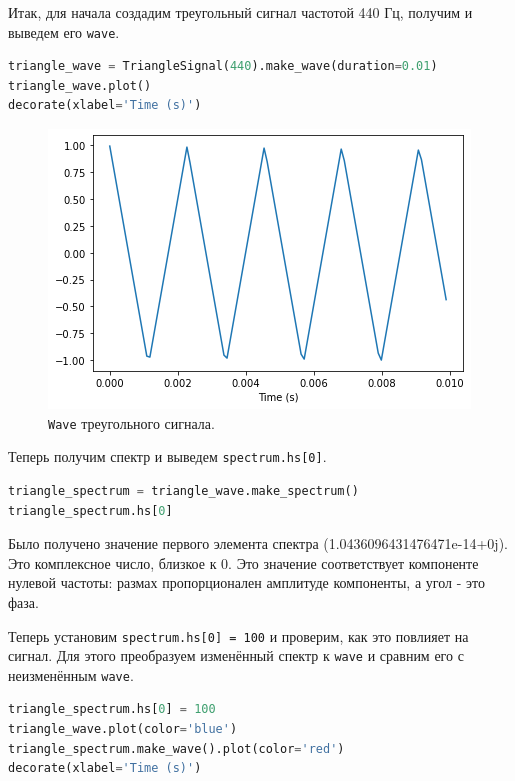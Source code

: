 \documentclass[a4paper, 14pt]{extarticle}
\begin{document}
    Итак, для начала создадим треугольный сигнал частотой 440 Гц, получим и выведем его \texttt{wave}.

    \begin{lstlisting}[language=Python, caption= Создание сигнала и получение\texttt{wave}., label={lst:task4_wave}]
triangle_wave = TriangleSignal(440).make_wave(duration=0.01)
triangle_wave.plot()
decorate(xlabel='Time (s)')
    \end{lstlisting}

    \begin{figure}[h]
        \centering
        \includegraphics[width=0.8\linewidth]{resources/Images/task4_wave}
        \caption{\texttt{Wave} треугольного сигнала.}
        \label{fig:task4_wave}
    \end{figure}

    Теперь получим спектр и выведем \texttt{spectrum.hs[0]}.

    \begin{lstlisting}[language=Python, caption= Получение спектра и вывод \texttt{spectrum.hs[0]}., label={lst:task4_spectrum_hs}]
triangle_spectrum = triangle_wave.make_spectrum()
triangle_spectrum.hs[0]
    \end{lstlisting}

    Было получено значение первого элемента спектра (1.0436096431476471e-14+0j). Это комплексное число, близкое к 0.
    Это значение соответствует компоненте нулевой частоты: размах пропорционален амплитуде компоненты,
    а угол - это фаза.

    Теперь установим \texttt{spectrum.hs[0] = 100} и проверим, как это повлияет на сигнал.
    Для этого преобразуем изменённый спектр к \texttt{wave} и сравним его с неизменённым \texttt{wave}.

    \begin{lstlisting}[language=Python, caption= Изменение первого элемента спектра и сравнение с первоначальным., label={lst:task4_editing_hs_and_copmare}]
triangle_spectrum.hs[0] = 100
triangle_wave.plot(color='blue')
triangle_spectrum.make_wave().plot(color='red')
decorate(xlabel='Time (s)')
    \end{lstlisting}
\end{document}
